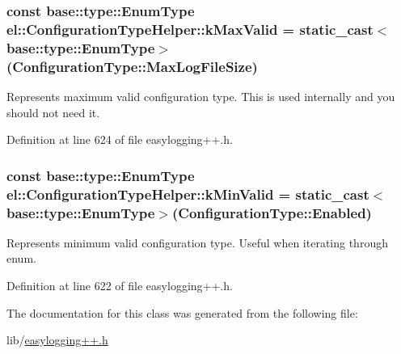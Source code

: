 \subsubsection[{k\+Max\+Valid}]{\setlength{\rightskip}{0pt plus 5cm}const {\bf base\+::type\+::\+Enum\+Type} el\+::\+Configuration\+Type\+Helper\+::k\+Max\+Valid = static\+\_\+cast$<${\bf base\+::type\+::\+Enum\+Type}$>$({\bf Configuration\+Type\+::\+Max\+Log\+File\+Size})\hspace{0.3cm}{\ttfamily [static]}}\label{classel_1_1_configuration_type_helper_aa02f3cefb127e7eb97d7e1dd7f51a12d}


Represents maximum valid configuration type. This is used internally and you should not need it. 



Definition at line 624 of file easylogging++.\+h.

\hypertarget{classel_1_1_configuration_type_helper_ab7266e698eb32dec2da285325a66e322}{}
\subsubsection[{k\+Min\+Valid}]{\setlength{\rightskip}{0pt plus 5cm}const {\bf base\+::type\+::\+Enum\+Type} el\+::\+Configuration\+Type\+Helper\+::k\+Min\+Valid = static\+\_\+cast$<${\bf base\+::type\+::\+Enum\+Type}$>$({\bf Configuration\+Type\+::\+Enabled})\hspace{0.3cm}{\ttfamily [static]}}\label{classel_1_1_configuration_type_helper_ab7266e698eb32dec2da285325a66e322}


Represents minimum valid configuration type. Useful when iterating through enum. 



Definition at line 622 of file easylogging++.\+h.



The documentation for this class was generated from the following file\+:\begin{DoxyCompactItemize}
\item 
lib/\hyperlink{easylogging_09_09_8h}{easylogging++.\+h}\end{DoxyCompactItemize}
